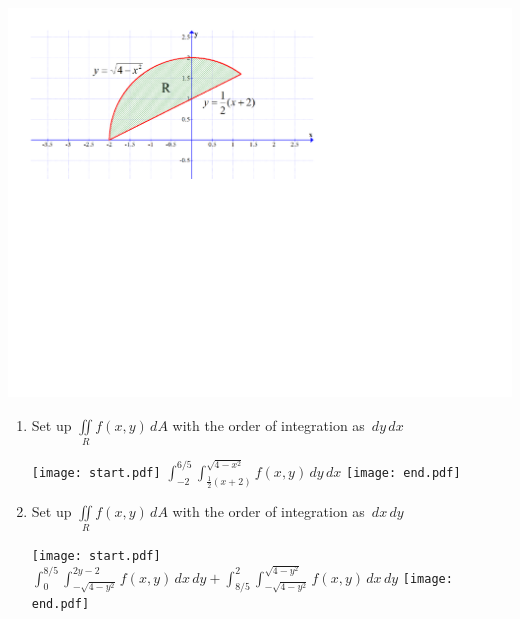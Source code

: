 \documentclass[12pt]{article}
\begin{document}
\begin{enumerate}
\begin{center}
\includegraphics[scale=0.5]{int2.pdf}
\end{center}

\begin{enumerate}

\item Set up $\iint \limits_{R} f(x,y) \,dA$ with the order of integration as $\,dy\,dx$

\texttt{[image: start.pdf]}
{{$\int_{-2}^{6/5} \int_{\frac{1}{2}(x+2)}^{\sqrt{4-x^2}} f(x,y) \,dy \,dx$}}
\texttt{[image: end.pdf]}


\item Set up $\iint \limits_{R} f(x,y) \,dA$ with the order of integration as $\,dx\,dy$

\texttt{[image: start.pdf]}
{{$\int_{0}^{8/5} \int_{-\sqrt{4-y^2}}^{2y-2} f(x,y) \,dx \,dy + \int_{8/5}^{2} \int_{-\sqrt{4-y^2}}^{\sqrt{4-y^2}} f(x,y) \,dx \,dy$}}
\texttt{[image: end.pdf]}


\end{enumerate}

\end{enumerate}

\end{document}
